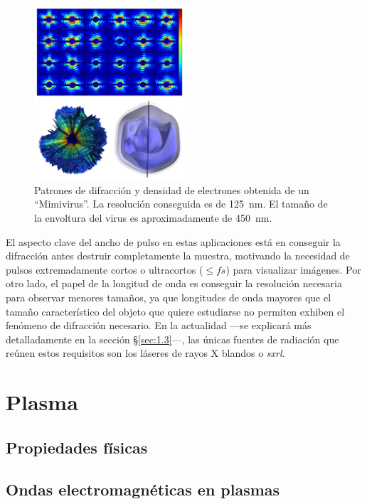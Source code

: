 \begin{figure}[htpb]
  \centering
  \includegraphics[width=0.5\textwidth]{Figuras/ch1_pulso.png}
  \caption{Patrones de difracción y densidad de electrones obtenida de un \enquote{Mimivirus}\autocite{Ekeberg2015}. La resolución conseguida es de \qty{125}{nm}. El tamaño de la envoltura del virus es aproximadamente de \qty{450}{nm}.}
  \label{fig:ch1_pulso}
\end{figure}

El aspecto clave del ancho de pulso en estas aplicaciones está en conseguir la difracción antes destruir completamente la muestra\autocite{Neutze2000}, motivando la necesidad de pulsos extremadamente cortos o ultracortos ($\le\unit{fs}$) para visualizar imágenes. Por otro lado, el papel de la longitud de onda es conseguir la resolución necesaria para observar menores tamaños, ya que longitudes de onda mayores que el tamaño característico del objeto que quiere estudiarse no permiten exhiben el fenómeno de difracción necesario. En la actualidad ---se explicará más detalladamente en la sección \S\ref{sec:1.3}---, las únicas fuentes de radiación que reúnen estos requisitos son los láseres de rayos X blandos o \emph{\acrfull{sxrl}}.

\section{Plasma}\label{sec:1.2}

\subsection{Propiedades físicas}\label{sec:1.2.1}

\subsection{Ondas electromagnéticas en plasmas}\label{sec:1.2.2}


